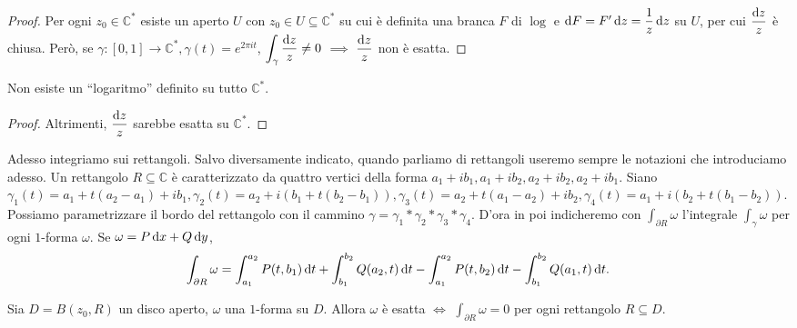 \begin{proof}
  Per ogni $z_0 \in \mathbb{C}^*$ esiste un aperto $U$ con $z_0 \in U \subseteq \mathbb{C}^*$ su cui è definita una branca $F$ di $\log$ e $\mathop{}\!\mathrm{d} F=F'\mathop{}\!\mathrm{d} z=\dfrac{1}{z}\mathop{}\!\mathrm{d} z$ su $U$, per cui $\dfrac{\mathop{}\!\mathrm{d} z}{z}$ è chiusa.
  Però, se $\gamma:[0,1] \longrightarrow \mathbb{C}^*, \gamma(t)=e^{2\pi it}$, $\displaystyle \int_{\gamma} \frac{\mathop{}\!\mathrm{d} z}{z}\not=0$ $\implies$ $\dfrac{\mathop{}\!\mathrm{d} z}{z}$ non è esatta.
\end{proof}

\begin{cor}
  Non esiste un ``logaritmo'' definito su tutto $\mathbb{C}^*$.
\end{cor}

\begin{proof}
  Altrimenti, $\dfrac{\mathop{}\!\mathrm{d} z}{z}$ sarebbe esatta su $\mathbb{C}^*$.
\end{proof}

Adesso integriamo sui rettangoli. Salvo diversamente indicato, quando parliamo di rettangoli useremo sempre le notazioni che introduciamo adesso. Un rettangolo $R \subseteq \mathbb{C}$ è caratterizzato da quattro vertici della forma $a_1+ib_1, a_1+ib_2, a_2+ib_2, a_2+ib_1$. Siano $\gamma_1(t)=a_1+t(a_2-a_1)+ib_1, \gamma_2(t)=a_2+i(b_1+t(b_2-b_1)), \gamma_3(t)=a_2+t(a_1-a_2)+ib_2, \gamma_4(t)=a_1+i(b_2+t(b_1-b_2))$.
Possiamo parametrizzare il bordo del rettangolo con il cammino $\gamma=\gamma_1*\gamma_2*\gamma_3*\gamma_4$. D'ora in poi indicheremo con $\displaystyle \int_{\partial R} \omega$ l'integrale $\displaystyle \int_{\gamma} \omega$ per  ogni $1$-forma $\omega$. Se $\omega=P\mathop{}\!\mathrm{d} x+Q\mathop{}\!\mathrm{d} y$,
$$\int_{\partial R} \omega=\int_{a_1}^{a_2}P(t, b_1)\mathop{}\!\mathrm{d} t+\int_{b_1}^{b_2}Q(a_2, t)\mathop{}\!\mathrm{d} t-\int_{a_1}^{a_2}P(t, b_2)\mathop{}\!\mathrm{d} t-\int_{b_1}^{b_2}Q(a_1, t)\mathop{}\!\mathrm{d} t.$$

\begin{prop} \label{int=0no2}
  Sia $D=B(z_0, R)$ un disco aperto, $\omega$ una $1$-forma su $D$. Allora $\omega$ è esatta $\iff$ $\displaystyle \int_{\partial R} \omega=0$ per ogni rettangolo $R \subseteq D$.
\end{prop}

